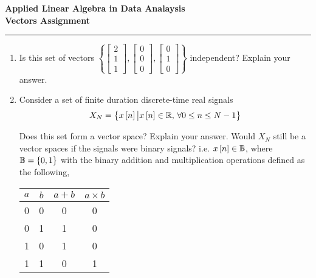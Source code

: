 \documentclass[12pt]{article}
\def\mb{\ensuremath\mathbb}
\def\lc{\ensuremath\left\{}
\def\rc{\ensuremath\right\}}
\def\ls{\ensuremath\left[}
\def\rs{\ensuremath\right]}
\newcommand{\dt}[1]{\ls #1\rs}
\begin{document}
\begin{center}
\begin{Large}
\textbf{Applied Linear Algebra in Data Analaysis}\\
\vspace{0.1cm}
\textbf{Vectors Assignment}
\end{Large}
\end{center}
\hrule

\vspace{0.2cm}

\begin{enumerate}
    \item Is this set of vectors $\left\{\begin{bmatrix}2 \\ 1 \\ 1\end{bmatrix}, \begin{bmatrix}0 \\ 0\\ 0\end{bmatrix}, \begin{bmatrix}0 \\ 1 \\ 0\end{bmatrix}\right\}$ independent? Explain your answer.

    \item Consider a set of finite duration discrete-time real signals 
    \[ X_N = \lc x\dt{n} \big\vert x\dt{n} \in \mb{R}, \,\forall 0 \leq n \leq N-1\rc \]
    
    Does this set form a vector space? Explain your answer. Would $X_N$ still be a vector spaces if the signals were binary signals? i.e. $x\dt{n} \in \mb{B}$, where $\mb{B} = \lc 0, 1\rc$ with the binary addition and multiplication operations defined as the following,

    \begin{center}
        \begin{minipage}[h]{.45\textwidth}
            \centering
            \begin{tabular}{|c|c|c|c|}
                \hline
                $a$ & $b$ & $a+b$ & $a \times b$ \\ \hline
                0 & 0 & 0   & 0     \\ \hline
                0 & 1 & 1   & 0     \\ \hline
                1 & 0 & 1   & 0     \\ \hline
                1 & 1 & 0   & 1     \\ \hline
            \end{tabular}\\
        \end{minipage}
    \end{center}
        

\end{enumerate}
\end{document}
